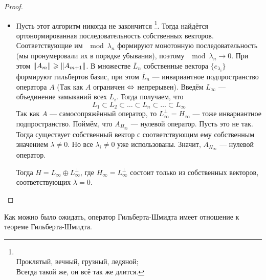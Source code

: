 \documentclass[12pt]{article}
\begin{document}
\begin{proof}
\begin{itemize}
			\item Пусть этот алгоритм никогда не закончится
				\footnote
				{
					\\
					Проклятый, вечный, грузный, ледяной; \\
					Всегда такой же, он всё так же длится.
				}.
				Тогда найдётся ортонормированная последовательность собственных векторов. Соответствующие им $\mod{\lambda_n}$ 
				формируют монотонную последовательность {\color{gray}(мы пронумеровали их в порядке убывания)}, поэтому 
				$\mod{\lambda_n} \rightarrow 0$. При этом 
				$\left\| A_m \right\| \geqslant \left\| A_{m+1} \right\|$. В множестве $\overline{L}_n$ собственные вектора $\{e_{\lambda_i}\}$ 
				формируют гильбертов базис, при этом $\overline{L}_n$ --- инвариантное подпространство оператора
				$A$ (Так как $A$ ограничен $\Leftrightarrow$ непрерывен). Введём $L_{\infty}$ --- объединение 
				замыканий всех $L_i$. Тогда получаем, что
				$$L_1 \subset L_2 \subset \dots \subset L_n \subset \dots \subset L_{\infty}$$
				Так как $A$ --- самосопряжённый оператор, то $L^{\perp}_{\infty} = H_{\infty}$ --- тоже инвариантное 
				подпространство. Поймём, что $A_{H_{\infty}}$ --- нулевой оператор. Пусть это не так. Тогда существует
				собственный вектор с соответствующим ему собственным значением $\lambda \neq 0$. Но все
				$\lambda_i \neq 0$ уже использованы. Значит, $A_{H_{\infty}}$ --- нулевой оператор.
			
				Тогда $H = L_{\infty} \oplus L^{\perp}_{\infty}$, где $H_{\infty} = L^{\perp}_{\infty}$ состоит только
				из собственных векторов, соответствующих $\lambda = 0$.
			\end{itemize}
		\end{proof}
	
		Как можно было ожидать, оператор Гильберта-Шмидта имеет отношение к теореме Гильберта-Шмидта.
	
\end{document}
